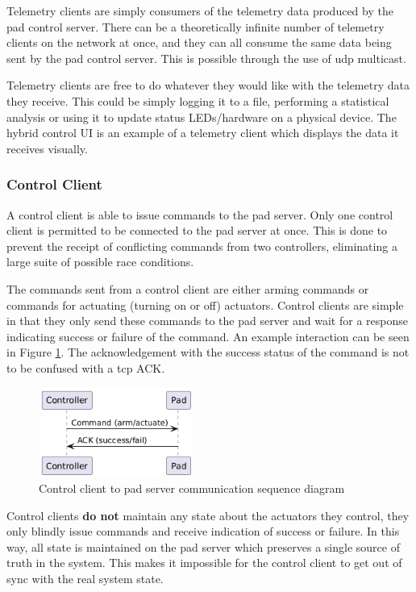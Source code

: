 Telemetry clients are simply consumers of the telemetry data produced by the pad control server. There can be a
theoretically infinite number of telemetry clients on the network at once, and they can all consume the same data being
sent by the pad control server. This is possible through the use of \gls{udp} multicast.

Telemetry clients are free to do whatever they would like with the telemetry data they receive. This could be simply
logging it to a file, performing a statistical analysis or using it to update status LEDs/hardware on a physical
device. The hybrid control UI is an example of a telemetry client which displays the data it receives visually.

\subsubsection{Control Client}

A control client is able to issue commands to the pad server. Only one control client is permitted to be connected to
the pad server at once. This is done to prevent the receipt of conflicting commands from two controllers, eliminating a
large suite of possible race conditions.

The commands sent from a control client are either arming commands or commands for actuating (turning on or off)
actuators. Control clients are simple in that they only send these commands to the pad server and wait for a response
indicating success or failure of the command. \cite{hybrid-comms} An example interaction can be seen in Figure
\ref{fig:cntrl-pad-seq}. The acknowledgement with the success status of the command is not to be confused with a
\gls{tcp} ACK.

\begin{figure}[H]
    \center
    \includegraphics[width=2in]{assets/diagrams/control_client_and_pad_sequence.png}
    \caption{Control client to pad server communication sequence diagram}
    \label{fig:cntrl-pad-seq}
\end{figure}

Control clients \textbf{do not} maintain any state about the actuators they control, they only blindly issue commands
and receive indication of success or failure. In this way, all state is maintained on the pad server which preserves a
single source of truth in the system. This makes it impossible for the control client to get out of sync with the real
system state.

